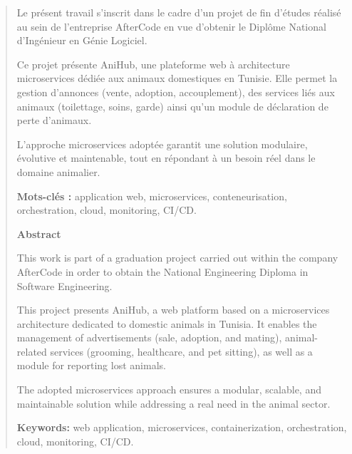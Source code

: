 \begin{abstract}

Le présent travail s’inscrit dans le cadre d’un projet de fin d’études réalisé au sein de l’entreprise AfterCode en vue d’obtenir le Diplôme National d’Ingénieur en Génie Logiciel. 

Ce projet présente AniHub, une plateforme web à architecture microservices dédiée aux animaux domestiques en Tunisie. Elle permet la gestion d’annonces (vente, adoption, accouplement), des services liés aux animaux (toilettage, soins, garde) ainsi qu’un module de déclaration de perte d’animaux.

L’approche microservices adoptée garantit une solution modulaire, évolutive et maintenable, tout en répondant à un besoin réel dans le domaine animalier.

\vspace{0.5cm}

\textbf{Mots-clés :} application web, microservices, conteneurisation, orchestration, cloud, monitoring, CI/CD.

\vspace{1cm}

\centerline{\bf Abstract}
\vspace{0.6cm}

This work is part of a graduation project carried out within the company AfterCode in order to obtain the National Engineering Diploma in Software Engineering.

This project presents AniHub, a web platform based on a microservices architecture dedicated to domestic animals in Tunisia. It enables the management of advertisements (sale, adoption, and mating), animal-related services (grooming, healthcare, and pet sitting), as well as a module for reporting lost animals.

The adopted microservices approach ensures a modular, scalable, and maintainable solution while addressing a real need in the animal sector.

\vspace{0.5cm}

\textbf{Keywords:} web application, microservices, containerization, orchestration, cloud, monitoring, CI/CD.
\end{abstract}